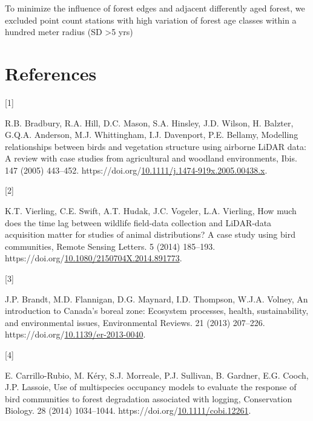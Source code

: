\documentclass[manuscript, 3p, authoryear]{elsarticle} %
\newlength{\cslhangindent}
\newlength{\csllabelwidth}
\newlength{\cslentryspacingunit} %
\newenvironment{CSLReferences}[2] %
 {%
  \setlength{\parindent}{0pt}
  \ifodd #1
  \let\oldpar\par
  \def\par{\hangindent=\cslhangindent\oldpar}
  \fi
  \setlength{\parskip}{#2\cslentryspacingunit}
 }%
 {}
\newcommand{\CSLLeftMargin}[1]{\parbox[t]{\csllabelwidth}{#1}}
\newcommand{\CSLRightInline}[1]{\parbox[t]{\linewidth - \csllabelwidth}{#1}\break}
\begin{document}
To minimize the influence of forest edges and adjacent differently aged forest, we excluded point count stations with high variation of forest age classes within a hundred meter radius (SD \textgreater5 yrs)

\hypertarget{references}{%
\section*{References}\label{references}}

\hypertarget{refs}{}
\begin{CSLReferences}{0}{0}
\leavevmode{}%
\CSLLeftMargin{{[}1{]} }%
\CSLRightInline{R.B. Bradbury, R.A. Hill, D.C. Mason, S.A. Hinsley, J.D. Wilson, H. Balzter, G.Q.A. Anderson, M.J. Whittingham, I.J. Davenport, P.E. Bellamy, Modelling relationships between birds and vegetation structure using airborne {LiDAR} data: A review with case studies from agricultural and woodland environments, Ibis. 147 (2005) 443--452. https://doi.org/\href{https://doi.org/10.1111/j.1474-919x.2005.00438.x}{10.1111/j.1474-919x.2005.00438.x}.}

\leavevmode{}%
\CSLLeftMargin{{[}2{]} }%
\CSLRightInline{K.T. Vierling, C.E. Swift, A.T. Hudak, J.C. Vogeler, L.A. Vierling, How much does the time lag between wildlife field-data collection and {LiDAR-data} acquisition matter for studies of animal distributions? {A} case study using bird communities, Remote Sensing Letters. 5 (2014) 185--193. https://doi.org/\href{https://doi.org/10.1080/2150704X.2014.891773}{10.1080/2150704X.2014.891773}.}

\leavevmode{}%
\CSLLeftMargin{{[}3{]} }%
\CSLRightInline{J.P. Brandt, M.D. Flannigan, D.G. Maynard, I.D. Thompson, W.J.A. Volney, An introduction to {Canada}'s boreal zone: {Ecosystem} processes, health, sustainability, and environmental issues, Environmental Reviews. 21 (2013) 207--226. https://doi.org/\href{https://doi.org/10.1139/er-2013-0040}{10.1139/er-2013-0040}.}

\leavevmode{}%
\CSLLeftMargin{{[}4{]} }%
\CSLRightInline{E. Carrillo-Rubio, M. Kéry, S.J. Morreale, P.J. Sullivan, B. Gardner, E.G. Cooch, J.P. Lassoie, Use of multispecies occupancy models to evaluate the response of bird communities to forest degradation associated with logging, Conservation Biology. 28 (2014) 1034--1044. https://doi.org/\href{https://doi.org/10.1111/cobi.12261}{10.1111/cobi.12261}.}


\end{CSLReferences}
\end{document}
